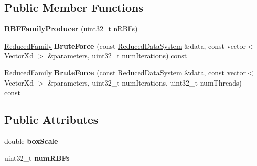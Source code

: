 \subsection*{Public Member Functions}
\begin{DoxyCompactItemize}
\item 
\hypertarget{struct_d_r_d_s_p_1_1_r_b_f_family_producer_a0282e37f5ef5428167e10724710c20e7}{{\bfseries R\-B\-F\-Family\-Producer} (uint32\-\_\-t n\-R\-B\-Fs)}\label{struct_d_r_d_s_p_1_1_r_b_f_family_producer_a0282e37f5ef5428167e10724710c20e7}

\item 
\hypertarget{struct_d_r_d_s_p_1_1_r_b_f_family_producer_a6e1dcce56a93b0504c2b1c4d36cc7ff3}{\hyperlink{struct_d_r_d_s_p_1_1_p_map_family}{Reduced\-Family} {\bfseries Brute\-Force} (const \hyperlink{struct_d_r_d_s_p_1_1_reduced_data_system}{Reduced\-Data\-System} \&data, const vector$<$ Vector\-Xd $>$ \&parameters, uint32\-\_\-t num\-Iterations) const }\label{struct_d_r_d_s_p_1_1_r_b_f_family_producer_a6e1dcce56a93b0504c2b1c4d36cc7ff3}

\item 
\hypertarget{struct_d_r_d_s_p_1_1_r_b_f_family_producer_af58f8bd5bdcd8730766c1bc186f4372c}{\hyperlink{struct_d_r_d_s_p_1_1_p_map_family}{Reduced\-Family} {\bfseries Brute\-Force} (const \hyperlink{struct_d_r_d_s_p_1_1_reduced_data_system}{Reduced\-Data\-System} \&data, const vector$<$ Vector\-Xd $>$ \&parameters, uint32\-\_\-t num\-Iterations, uint32\-\_\-t num\-Threads) const }\label{struct_d_r_d_s_p_1_1_r_b_f_family_producer_af58f8bd5bdcd8730766c1bc186f4372c}

\end{DoxyCompactItemize}
\subsection*{Public Attributes}
\begin{DoxyCompactItemize}
\item 
\hypertarget{struct_d_r_d_s_p_1_1_r_b_f_family_producer_a83431f5c3b6616def3277dbc57fe412b}{double {\bfseries box\-Scale}}\label{struct_d_r_d_s_p_1_1_r_b_f_family_producer_a83431f5c3b6616def3277dbc57fe412b}

\item 
\hypertarget{struct_d_r_d_s_p_1_1_r_b_f_family_producer_ad65e12c9e040fba915381b0af0031b21}{uint32\-\_\-t {\bfseries num\-R\-B\-Fs}}\label{struct_d_r_d_s_p_1_1_r_b_f_family_producer_ad65e12c9e040fba915381b0af0031b21}

\end{DoxyCompactItemize}
